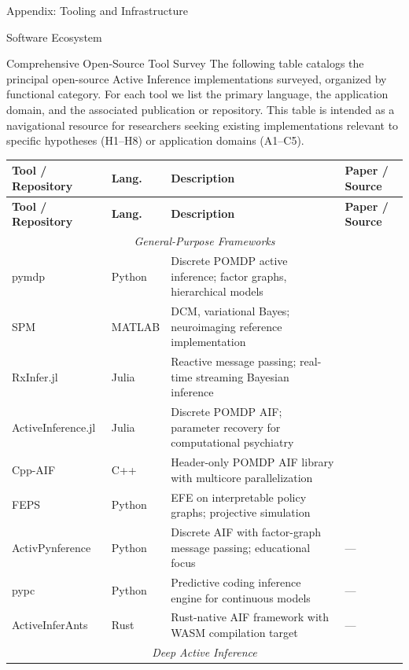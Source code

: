 \documentclass[
  ignorenonframetext,
]{beamer}
\begin{document}
\begin{frame}[fragile]{Appendix: Tooling and Infrastructure
\label{sec:tooling}}
\begin{block}{Software Ecosystem}
\begin{block}{Comprehensive Open-Source Tool Survey}
\protect{}\label{comprehensive-open-source-tool-survey}
The following table catalogs the principal open-source Active Inference
implementations surveyed, organized by functional category. For each
tool we list the primary language, the application domain, and the
associated publication or repository. This table is intended as a
navigational resource for researchers seeking existing implementations
relevant to specific hypotheses (H1--H8) or application domains
(A1--C5).

\begin{center}
\small
\begin{longtable}{p{3.2cm} p{1.6cm} p{4.4cm} p{2.5cm}}
\hline
\textbf{Tool / Repository} & \textbf{Lang.} & \textbf{Description} & \textbf{Paper / Source} \\
\hline
\endfirsthead
\hline
\textbf{Tool / Repository} & \textbf{Lang.} & \textbf{Description} & \textbf{Paper / Source} \\
\hline
\endhead
\multicolumn{4}{c}{\textit{General-Purpose Frameworks}} \\
\hline
pymdp & Python & Discrete POMDP active inference; factor graphs, hierarchical models & \cite{heins2022pymdp} \\
SPM & MATLAB & DCM, variational Bayes; neuroimaging reference implementation & \cite{friston2017active} \\
RxInfer.jl & Julia & Reactive message passing; real-time streaming Bayesian inference & \cite{rxinfer2025} \\
ActiveInference.jl & Julia & Discrete POMDP AIF; parameter recovery for computational psychiatry & \cite{ActiveInferencejl} \\
Cpp-AIF & C++ & Header-only POMDP AIF library with multicore parallelization & \cite{gregoretti2023cppaif} \\
FEPS & Python & EFE on interpretable policy graphs; projective simulation & \cite{pazem2024feps} \\
ActivPynference & Python & Discrete AIF with factor-graph message passing; educational focus & — \\
pypc & Python & Predictive coding inference engine for continuous models & — \\
ActiveInferAnts & Rust & Rust-native AIF framework with WASM compilation target & — \\
\hline
\multicolumn{4}{c}{\textit{Deep Active Inference}} \\

\end{longtable}
\end{center}
\end{block}
\end{block}
\end{frame}
\end{document}

